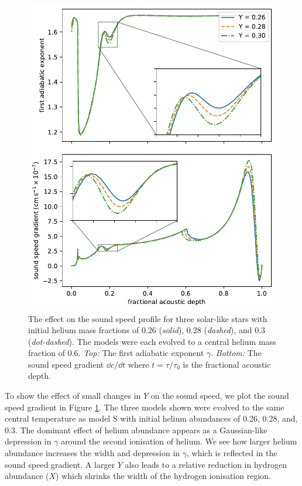 \begin{figure}
    \centering
    \includegraphics{figures/helium-ionisation-sound-speed.pdf}
    \caption[The effect on the sound speed profile for three solar-like stars with initial helium mass fractions of 0.26, 0.28, and 0.3.]{The effect on the sound speed profile for three solar-like stars with initial helium mass fractions of 0.26 (\emph{solid}), 0.28 (\emph{dashed}), and 0.3 (\emph{dot-dashed}). The models were each evolved to a central helium mass fraction of 0.6. \emph{Top:} The first adiabatic exponent \(\gamma\). \emph{Bottom:} The sound speed gradient \(\dd c/\dd t\) where \(t = \tau/\tau_0\) is the fractional acoustic depth.}
    \label{fig:gamma-sound-speed}
\end{figure}

To show the effect of small changes in \(Y\) on the sound speed, we plot the sound speed gradient in Figure \ref{fig:gamma-sound-speed}. The three models shown were evolved to the same central temperature as model S with initial helium abundances of 0.26, 0.28, and, 0.3. The dominant effect of helium abundance appears as a Gaussian-like depression in \(\gamma\) around the second ionisation of helium. We see how larger helium abundance increases the width and depression in \(\gamma\), which is reflected in the sound speed gradient. A larger \(Y\) also leads to a relative reduction in hydrogen abundance (\(X\)) which shrinks the width of the hydrogen ionisation region.

